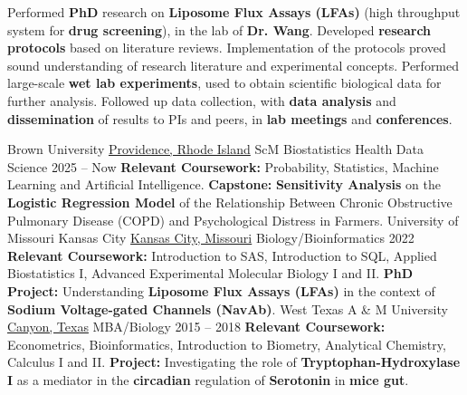 \documentclass[9pt]{adeckcv} %
\begin{document}
\begin{entrylist}
{\itemizeexperience
  {Performed \textbf{PhD} research on \textbf{Liposome Flux Assays (LFAs)} (high throughput system for \textbf{drug screening}), in the lab of \textbf{Dr. Wang}.}
  {Developed \textbf{research protocols} based on literature reviews. Implementation of the protocols proved sound understanding of research literature and experimental concepts.}
  {Performed large-scale \textbf{wet lab experiments}, used to obtain scientific biological data for further analysis. Followed up data collection, with \textbf{data analysis} and \textbf{dissemination} of results to PIs and peers, in \textbf{lab meetings} and \textbf{conferences}.}
  \faDna\slashsep
  \faFlask{}\slashsep
  \faPills{}\slashsep
  \faSlideshare
}
\end{entrylist}



  

\begin{entrylist}
\entry
{\large{Brown University}} 
{\href{https://www.google.com/maps/search/?api=1\&query=41.8239593,-71.4068603}{Providence, Rhode Island}}
{ScM Biostatistics Health Data Science}
{2025 -- Now}
{\itemizeeducation
  {\textbf{Relevant Coursework:} Probability, Statistics, Machine Learning and Artificial Intelligence.}
  {\textbf{Capstone:} \textbf{Sensitivity Analysis} on the \textbf{Logistic Regression Model} of the Relationship Between Chronic Obstructive Pulmonary Disease (COPD) and Psychological Distress in Farmers.}
}
\entry
{\large{University of Missouri Kansas City}} 
{\href{https://www.google.com/maps/search/?api=1\&query=39.0349318,-94.5745504}{Kansas City, Missouri}}
{Biology/Bioinformatics}
{2022}
{\itemizeeducation
  {\textbf{Relevant Coursework:} Introduction to SAS, Introduction to SQL, Applied Biostatistics I, Advanced Experimental Molecular Biology I and II.}
  {\textbf{PhD Project:} Understanding \textbf{Liposome Flux Assays (LFAs)} in the context of \textbf{Sodium Voltage-gated Channels (NavAb)}.}
}
\entry
{\large{West Texas A \& M University}} 
{\href{https://www.google.com/maps/search/?api=1\&query=34.9828857,-101.9170101}{Canyon, Texas}}
{MBA/Biology}
{2015 -- 2018}
{\itemizeeducation
  {\textbf{Relevant Coursework:} Econometrics, Bioinformatics, Introduction to Biometry, Analytical Chemistry, Calculus I and II.}
  {\textbf{Project:} Investigating the role of \textbf{Tryptophan-Hydroxylase I} as a mediator in the \textbf{circadian} regulation of \textbf{Serotonin} in \textbf{mice gut}.}
}
\end{entrylist}
\end{document}
